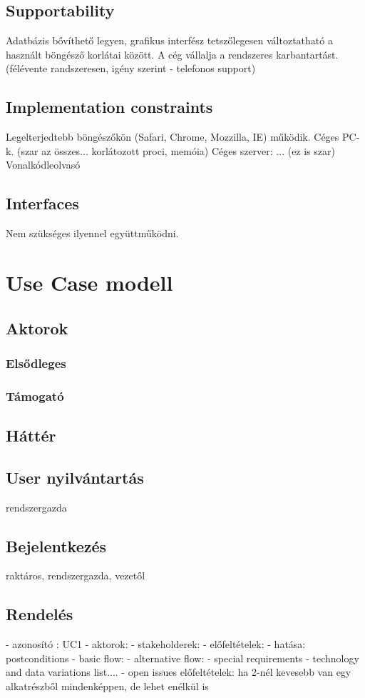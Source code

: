 \documentclass[11pt]{article}\usepackage[left=20mm,right=20mm,top=15mm,bottom=20mm]{geometry}
\begin{document}
\subsection{Supportability}
Adatbázis bővíthető legyen, grafikus interfész tetszőlegesen változtatható a használt böngésző korlátai között.
A cég vállalja a rendszeres karbantartást. (félévente randszeresen, igény szerint - telefonos support)

\subsection{Implementation constraints}
Legelterjedtebb böngészőkön (Safari, Chrome, Mozzilla, IE) működik.
Céges PC-k. (szar az összes... korlátozott proci, memóia) Céges szerver: ... (ez is szar)
Vonalkódleolvasó

\subsection{Interfaces}
Nem szükséges ilyennel együttműködni.

\section{Use Case modell}
\subsection{Aktorok}
\subsubsection{Elsődleges}
\subsubsection{Támogató}
\subsection{Háttér}

\subsection{User nyilvántartás}
rendszergazda

\subsection{Bejelentkezés}
raktáros, rendszergazda, vezetől

\subsection{Rendelés}
- azonosító : UC1
- aktorok: 
- stakeholderek:
- előfeltételek:
- hatása: postconditions
- basic flow:
- alternative flow:
- special requirements
- technology and data variations list.... 
- open issues
előfeltételek: ha 2-nél kevesebb van egy alkatrészből mindenképpen, de lehet enélkül is
\end{document}
